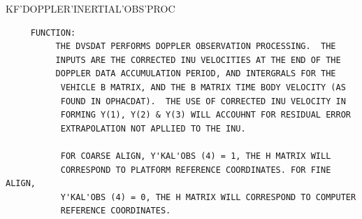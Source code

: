 \begin{frame}
KF'DOPPLER'INERTIAL'OBS'PROC
\begin{verbatim}
     FUNCTION:
          THE DVSDAT PERFORMS DOPPLER OBSERVATION PROCESSING.  THE
          INPUTS ARE THE CORRECTED INU VELOCITIES AT THE END OF THE
          DOPPLER DATA ACCUMULATION PERIOD, AND INTERGRALS FOR THE
           VEHICLE B MATRIX, AND THE B MATRIX TIME BODY VELOCITY (AS
           FOUND IN OPHACDAT).  THE USE OF CORRECTED INU VELOCITY IN
           FORMING Y(1), Y(2) & Y(3) WILL ACCOUHNT FOR RESIDUAL ERROR
           EXTRAPOLATION NOT APLLIED TO THE INU.

           FOR COARSE ALIGN, Y'KAL'OBS (4) = 1, THE H MATRIX WILL
           CORRESPOND TO PLATFORM REFERENCE COORDINATES. FOR FINE ALIGN,
           Y'KAL'OBS (4) = 0, THE H MATRIX WILL CORRESPOND TO COMPUTER
           REFERENCE COORDINATES.

\end{verbatim}
\end{frame}
